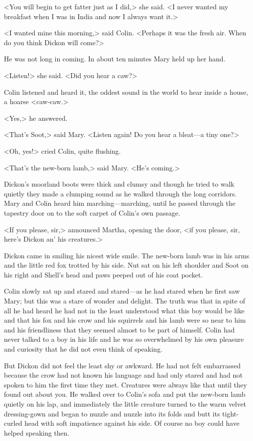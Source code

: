 <You will begin to get fatter just as I did,> she said. <I never wanted my breakfast when I was in India and now I always want it.>

<I wanted mine this morning,> said Colin. <Perhaps it was the fresh air. When do you think Dickon will come?>

He was not long in coming. In about ten minutes Mary held up her hand.

<Listen!> she said. <Did you hear a caw?>

Colin listened and heard it, the oddest sound in the world to hear inside a house, a hoarse <caw-caw.>

<Yes,> he answered.

<That's Soot,> said Mary. <Listen again! Do you hear a bleat—a tiny one?>

<Oh, yes!> cried Colin, quite flushing.

<That's the new-born lamb,> said Mary. <He's coming.>

Dickon's moorland boots were thick and clumsy and though he tried to walk quietly they made a clumping sound as he walked through the long corridors. Mary and Colin heard him marching—marching, until he passed through the tapestry door on to the soft carpet of Colin's own passage.

<If you please, sir,> announced Martha, opening the door, <if you please, sir, here's Dickon an' his creatures.>

Dickon came in smiling his nicest wide smile. The new-born lamb was in his arms and the little red fox trotted by his side. Nut sat on his left shoulder and Soot on his right and Shell's head and paws peeped out of his coat pocket.

Colin slowly sat up and stared and stared—as he had stared when he first saw Mary; but this was a stare of wonder and delight. The truth was that in spite of all he had heard he had not in the least understood what this boy would be like and that his fox and his crow and his squirrels and his lamb were so near to him and his friendliness that they seemed almost to be part of himself. Colin had never talked to a boy in his life and he was so overwhelmed by his own pleasure and curiosity that he did not even think of speaking.

But Dickon did not feel the least shy or awkward. He had not felt embarrassed because the crow had not known his language and had only stared and had not spoken to him the first time they met. Creatures were always like that until they found out about you. He walked over to Colin's sofa and put the new-born lamb quietly on his lap, and immediately the little creature turned to the warm velvet dressing-gown and began to nuzzle and nuzzle into its folds and butt its tight-curled head with soft impatience against his side. Of course no boy could have helped speaking then.

